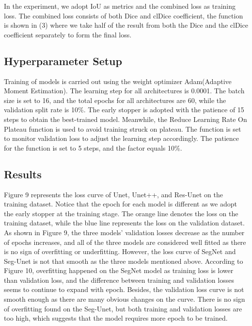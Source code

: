 \documentclass{article}
\begin{document}
In the experiment, we adopt IoU as metrics and the combined loss as training loss. The combined loss consists of both Dice and clDice coefficient, the function is shown in (3) where we take half of the result from both the Dice and the clDice coefficient separately to form the final loss.

\subsection{Hyperparameter Setup}
Training of models is carried out using the weight optimizer Adam(Adaptive Moment Estimation). The learning step for all architectures is 0.0001. The batch size is set to 16, and the total epochs for all architectures are 60, while the validation split rate is 10\%. The early stopper is adopted with the patience of 15 steps to obtain the best-trained model. Meanwhile, the Reduce Learning Rate On Plateau function is used to avoid training struck on plateau. The function is set to monitor validation loss to adjust the learning step accordingly. The patience for the function is set to 5 steps, and the factor equals 10\%.

\subsection{Results}
Figure 9 represents the loss curve of Unet, Unet++, and Res-Unet on the training dataset. Notice that the epoch for each model is different as we adopt the early stopper at the training stage. The orange line denotes the loss on the training dataset, while the blue line represents the loss on the validation dataset. As shown in Figure 9, the three models' validation losses decrease as the number of epochs increases, and all of the three models are considered well fitted as there is no sign of overfitting or underfitting. However, the loss curve of SegNet and Seg-Unet is not that smooth as the three models mentioned above.
According to Figure 10, overfitting happened on the SegNet model as training loss is lower than validation loss, and the difference between training and validation losses seems to continue to expand with epoch. Besides, the validation loss curve is not smooth enough as there are many obvious changes on the curve. There is no sign of overfitting found on the Seg-Unet, but both training and validation losses are too high, which suggests that the model requires more epoch to be trained.
\end{document}
